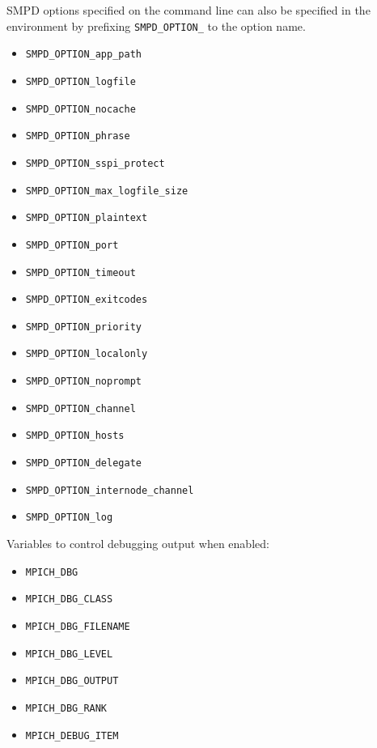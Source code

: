 \documentclass[dvipdfm,11pt]{article}
\begin{document}
SMPD options specified on the command line can also be specified in the environment
by prefixing \texttt{SMPD\_OPTION\_} to the option name.
\begin{itemize}
\item \texttt{SMPD\_OPTION\_app\_path}
\item \texttt{SMPD\_OPTION\_logfile}
\item \texttt{SMPD\_OPTION\_nocache}
\item \texttt{SMPD\_OPTION\_phrase}
\item \texttt{SMPD\_OPTION\_sspi\_protect}
\item \texttt{SMPD\_OPTION\_max\_logfile\_size}
\item \texttt{SMPD\_OPTION\_plaintext}
\item \texttt{SMPD\_OPTION\_port}
\item \texttt{SMPD\_OPTION\_timeout}
\item \texttt{SMPD\_OPTION\_exitcodes}
\item \texttt{SMPD\_OPTION\_priority}
\item \texttt{SMPD\_OPTION\_localonly}
\item \texttt{SMPD\_OPTION\_noprompt}
\item \texttt{SMPD\_OPTION\_channel}
\item \texttt{SMPD\_OPTION\_hosts}
\item \texttt{SMPD\_OPTION\_delegate}
\item \texttt{SMPD\_OPTION\_internode\_channel}
\item \texttt{SMPD\_OPTION\_log}
\end{itemize}

Variables to control debugging output when enabled:
\begin{itemize}
\item \texttt{MPICH\_DBG}
\item \texttt{MPICH\_DBG\_CLASS}
\item \texttt{MPICH\_DBG\_FILENAME}
\item \texttt{MPICH\_DBG\_LEVEL}
\item \texttt{MPICH\_DBG\_OUTPUT}
\item \texttt{MPICH\_DBG\_RANK}
\item \texttt{MPICH\_DEBUG\_ITEM}
\end{itemize}
\end{document}
